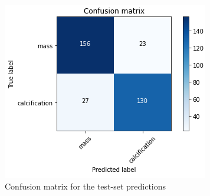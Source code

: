 \documentclass[11pt,a4paper,oneside]{article}
\begin{document}
\begin{figure}[h]
\begin{minipage}[c]{.4\textwidth}
		\includegraphics[width=.9\textwidth]{images/4.1/Siamese/Conf_Matrix_fe}
		\caption{Confusion matrix for the test-set predictions}
		\label{fig:siamese_matrix_fe}
	\end{minipage}%
\end{figure}
\end{document}
